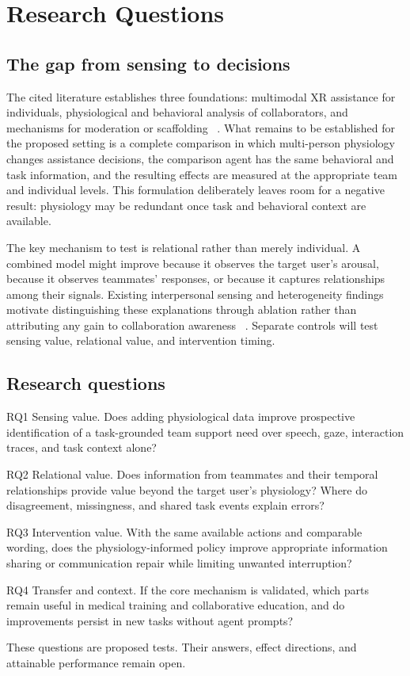 \section{Research Questions}
\label{sec:3}

\subsection{The gap from sensing to decisions}

The cited literature establishes three foundations: multimodal XR assistance for individuals, physiological and behavioral analysis of collaborators, and mechanisms for moderation or scaffolding ~\cite{pro2,guide,p52,p57,p34,p51}. What remains to be established for the proposed setting is a complete comparison in which multi-person physiology changes assistance decisions, the comparison agent has the same behavioral and task information, and the resulting effects are measured at the appropriate team and individual levels. This formulation deliberately leaves room for a negative result: physiology may be redundant once task and behavioral context are available.

The key mechanism to test is relational rather than merely individual. A combined model might improve because it observes the target user's arousal, because it observes teammates' responses, or because it captures relationships among their signals. Existing interpersonal sensing and heterogeneity findings motivate distinguishing these explanations through ablation rather than attributing any gain to collaboration awareness ~\cite{p52,p32,hhiss}. Separate controls will test sensing value, relational value, and intervention timing.

\subsection{Research questions}

RQ1 Sensing value. Does adding physiological data improve prospective identification of a task-grounded team support need over speech, gaze, interaction traces, and task context alone?

RQ2 Relational value. Does information from teammates and their temporal relationships provide value beyond the target user's physiology? Where do disagreement, missingness, and shared task events explain errors?

RQ3 Intervention value. With the same available actions and comparable wording, does the physiology-informed policy improve appropriate information sharing or communication repair while limiting unwanted interruption?

RQ4 Transfer and context. If the core mechanism is validated, which parts remain useful in medical training and collaborative education, and do improvements persist in new tasks without agent prompts?

These questions are proposed tests. Their answers, effect directions, and attainable performance remain open.

